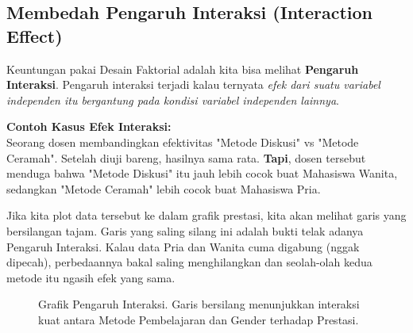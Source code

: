 \documentclass[12pt,a4paper]{article}
\begin{document}
\subsection{Membedah Pengaruh Interaksi (Interaction Effect)}
Keuntungan pakai Desain Faktorial adalah kita bisa melihat \textbf{Pengaruh Interaksi}. Pengaruh interaksi terjadi kalau ternyata \textit{efek dari suatu variabel independen itu bergantung pada kondisi variabel independen lainnya}.

\begin{notebox}
\textbf{Contoh Kasus Efek Interaksi:}\\
Seorang dosen membandingkan efektivitas "Metode Diskusi" vs "Metode Ceramah". Setelah diuji bareng, hasilnya sama rata. \textbf{Tapi}, dosen tersebut menduga bahwa "Metode Diskusi" itu jauh lebih cocok buat Mahasiswa Wanita, sedangkan "Metode Ceramah" lebih cocok buat Mahasiswa Pria.
\end{notebox}

Jika kita plot data tersebut ke dalam grafik prestasi, kita akan melihat garis yang bersilangan tajam. Garis yang saling silang ini adalah bukti telak adanya Pengaruh Interaksi. Kalau data Pria dan Wanita cuma digabung (nggak dipecah), perbedaannya bakal saling menghilangkan dan seolah-olah kedua metode itu ngasih efek yang sama.

\begin{figure}[h]
    \centering
    \caption{Grafik Pengaruh Interaksi. Garis bersilang menunjukkan interaksi kuat antara Metode Pembelajaran dan Gender terhadap Prestasi.}
\end{figure}
\end{document}
